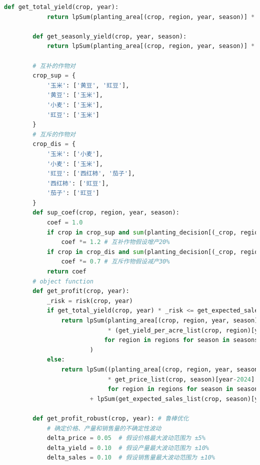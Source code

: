 \documentclass{cumcmthesis}
\begin{document}
\begin{appendices}
\begin{lstlisting}[language=python]
        def get_total_yield(crop, year):
            return lpSum(planting_area[(crop, region, year, season)] * get_yield_per_acre_list(crop, region)[year-2024] for region in regions for season in seasons)
        
        def get_seasonly_yield(crop, year, season):
            return lpSum(planting_area[(crop, region, year, season)] * get_yield_per_acre_list(crop, region)[year-2024] for region in regions)
    
        # 互补的作物对
        crop_sup = {
            '玉米': ['黄豆', '豇豆'],
            '黄豆': ['玉米'],
            '小麦': ['玉米'],
            '豇豆': ['玉米']
        }
        # 互斥的作物对
        crop_dis = {
            '玉米': ['小麦'],
            '小麦': ['玉米'],
            '豇豆': ['西红柿', '茄子'],
            '西红柿': ['豇豆'],
            '茄子': ['豇豆']
        }
        def sup_coef(crop, region, year, season):
            coef = 1.0
            if crop in crop_sup and sum(planting_decision[(_crop, region, year, season)] for _crop in crop_sup[crop]) >= 1:
                coef *= 1.2 # 互补作物假设增产20%
            if crop in crop_dis and sum(planting_decision[(_crop, region, year, season)] for _crop in crop_dis[crop]) >= 1:
                coef *= 0.7 # 互斥作物假设减产30%
            return coef
        # object function
        def get_profit(crop, year):
            _risk = risk(crop, year)
            if get_total_yield(crop, year) * _risk <= get_expected_sales_list(crop, '第一季')[year-2024] + get_expected_sales_list(crop, '第二季')[year-2024]:
                return lpSum(planting_area[(crop, region, year, season)]
                             * (get_yield_per_acre_list(crop, region)[year-2024] * get_price_list(crop, season)[year-2024] * _risk - get_cost_list(crop, region)[year-2024])
                            for region in regions for season in seasons
                        )
            else:
                return lpSum((planting_area[(crop, region, year, season)] * get_yield_per_acre_list(crop, region)[year-2024] - get_expected_sales_list(crop, season)[year-2024] - get_cost_list(crop, region)[year-2024])
                             * get_price_list(crop, season)[year-2024] * (1 - reduction_factor) 
                             for region in regions for season in seasons) \
                        + lpSum(get_expected_sales_list(crop, season)[year-2024] * get_price_list(crop, season)[year-2024] for season in seasons)
            
        def get_profit_robust(crop, year): # 鲁棒优化
            # 确定价格、产量和销售量的不确定性波动
            delta_price = 0.05  # 假设价格最大波动范围为 ±5%
            delta_yield = 0.10  # 假设产量最大波动范围为 ±10%
            delta_sales = 0.10  # 假设销售量最大波动范围为 ±10%
    

\end{lstlisting}
\end{appendices}
\end{document}
